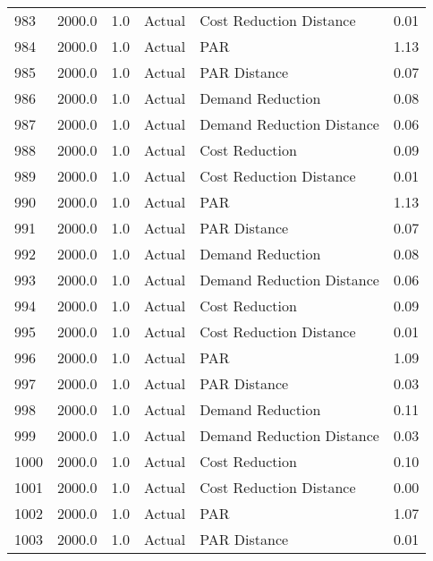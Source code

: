 \begin{longtable}{lrrllr}
983  &       2000.0 &     1.0 &         Actual &    Cost Reduction Distance &   0.01 \\
984  &       2000.0 &     1.0 &         Actual &                        PAR &   1.13 \\
985  &       2000.0 &     1.0 &         Actual &               PAR Distance &   0.07 \\
986  &       2000.0 &     1.0 &         Actual &           Demand Reduction &   0.08 \\
987  &       2000.0 &     1.0 &         Actual &  Demand Reduction Distance &   0.06 \\
988  &       2000.0 &     1.0 &         Actual &             Cost Reduction &   0.09 \\
989  &       2000.0 &     1.0 &         Actual &    Cost Reduction Distance &   0.01 \\
990  &       2000.0 &     1.0 &         Actual &                        PAR &   1.13 \\
991  &       2000.0 &     1.0 &         Actual &               PAR Distance &   0.07 \\
992  &       2000.0 &     1.0 &         Actual &           Demand Reduction &   0.08 \\
993  &       2000.0 &     1.0 &         Actual &  Demand Reduction Distance &   0.06 \\
994  &       2000.0 &     1.0 &         Actual &             Cost Reduction &   0.09 \\
995  &       2000.0 &     1.0 &         Actual &    Cost Reduction Distance &   0.01 \\
996  &       2000.0 &     1.0 &         Actual &                        PAR &   1.09 \\
997  &       2000.0 &     1.0 &         Actual &               PAR Distance &   0.03 \\
998  &       2000.0 &     1.0 &         Actual &           Demand Reduction &   0.11 \\
999  &       2000.0 &     1.0 &         Actual &  Demand Reduction Distance &   0.03 \\
1000 &       2000.0 &     1.0 &         Actual &             Cost Reduction &   0.10 \\
1001 &       2000.0 &     1.0 &         Actual &    Cost Reduction Distance &   0.00 \\
1002 &       2000.0 &     1.0 &         Actual &                        PAR &   1.07 \\
1003 &       2000.0 &     1.0 &         Actual &               PAR Distance &   0.01 \\

\end{longtable}
